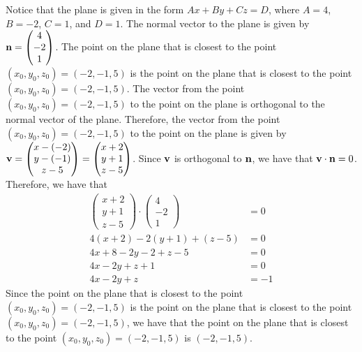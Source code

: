 \documentclass{article}
\begin{document}
\begin{solutionbox}
    Notice that the plane is given in the form \( Ax + By + Cz = D \), where \( A = 4 \), \( B = -2 \), \( C = 1 \), and \( D = 1 \). The normal vector to the plane is given by \( \vb{n} = \begin{pmatrix} 4 \\ -2 \\ 1 \end{pmatrix} \). The point on the plane that is closest to the point \( (x_0, y_0, z_0) = (-2, -1, 5) \) is the point on the plane that is closest to the point \( (x_0, y_0, z_0) = (-2, -1, 5) \). The vector from the point \( (x_0, y_0, z_0) = (-2, -1, 5) \) to the point on the plane is orthogonal to the normal vector of the plane. Therefore, the vector from the point \( (x_0, y_0, z_0) = (-2, -1, 5) \) to the point on the plane is given by \( \vb{v} = \begin{pmatrix} x - (-2) \\ y - (-1) \\ z - 5 \end{pmatrix} = \begin{pmatrix} x + 2 \\ y + 1 \\ z - 5 \end{pmatrix} \). Since \( \vb{v} \) is orthogonal to \( \vb{n} \), we have that \( \vb{v} \cdot \vb{n} = 0 \). Therefore, we have that
    \begin{align*}
        \begin{pmatrix} x + 2 \\ y + 1 \\ z - 5 \end{pmatrix} \cdot \begin{pmatrix} 4 \\ -2 \\ 1 \end{pmatrix} &= 0 \\
        4(x + 2) - 2(y + 1) + (z - 5) &= 0 \\
        4x + 8 - 2y - 2 + z - 5 &= 0 \\
        4x - 2y + z + 1 &= 0 \\
        4x - 2y + z &= -1
    \end{align*}
    Since the point on the plane that is closest to the point \( (x_0, y_0, z_0) = (-2, -1, 5) \) is the point on the plane that is closest to the point \( (x_0, y_0, z_0) = (-2, -1, 5) \), we have that the point on the plane that is closest to the point \( (x_0, y_0, z_0) = (-2, -1, 5) \) is \( (-2, -1, 5) \).
\end{solutionbox}
\end{document}
